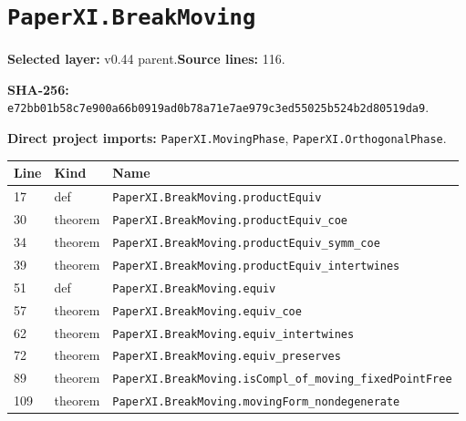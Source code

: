 \documentclass[10pt,oneside]{book}
\begin{document}
\section{\texorpdfstring{\nolinkurl{PaperXI.BreakMoving}}{PaperXI.BreakMoving}}\label{module:PaperXI.BreakMoving}

\textbf{Selected layer:} v0.44 parent.\quad\textbf{Source lines:} 116.\par\textbf{SHA-256:} {\scriptsize\nolinkurl{e72bb01b58c7e900a66b0919ad0b78a71e7ae979c3ed55025b524b2d80519da9}}.


\textbf{Direct project imports:} \nolinkurl{PaperXI.MovingPhase}, \nolinkurl{PaperXI.OrthogonalPhase}.

\begin{longtable}{@{}p{}p{}p{}@{}}\toprule Line&Kind&Name\\\midrule\endhead

17&def&\nolinkurl{PaperXI.BreakMoving.productEquiv}\\

30&theorem&\nolinkurl{PaperXI.BreakMoving.productEquiv_coe}\\

34&theorem&\nolinkurl{PaperXI.BreakMoving.productEquiv_symm_coe}\\

39&theorem&\nolinkurl{PaperXI.BreakMoving.productEquiv_intertwines}\\

51&def&\nolinkurl{PaperXI.BreakMoving.equiv}\\

57&theorem&\nolinkurl{PaperXI.BreakMoving.equiv_coe}\\

62&theorem&\nolinkurl{PaperXI.BreakMoving.equiv_intertwines}\\

72&theorem&\nolinkurl{PaperXI.BreakMoving.equiv_preserves}\\

89&theorem&\nolinkurl{PaperXI.BreakMoving.isCompl_of_moving_fixedPointFree}\\

109&theorem&\nolinkurl{PaperXI.BreakMoving.movingForm_nondegenerate}\\

\bottomrule\end{longtable}
\end{document}
